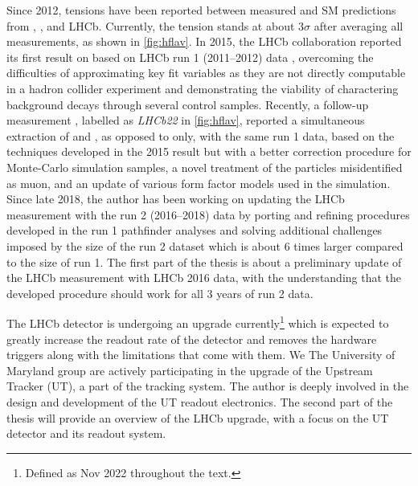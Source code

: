 Since 2012, tensions have been reported between measured \RDX and SM
predictions from \babar, \belle, and LHCb.
Currently, the tension stands at about $3 \sigma$ after averaging all
measurements,
as shown in \cref{fig:hflav}.
In 2015, the LHCb collaboration reported its first result on \RDst
based on LHCb run 1 (2011--2012) data
\cite{PhysRevLett.115.111803},
overcoming the difficulties of approximating key fit variables
as they are not directly computable in a hadron collider experiment
and demonstrating the viability of charactering background decays through
several control samples.
Recently, a follow-up measurement
\cite{RD_RDst_run1_2023},
labelled as \emph{LHCb22} in \cref{fig:hflav},
reported a simultaneous extraction of \RD and \RDst,
as opposed to \RDst only,
with the same run 1 data,
based on the techniques developed in the 2015 result but with
a better correction procedure for Monte-Carlo simulation samples,
a novel treatment of the particles misidentified as muon,
and an update of various form factor models used in the simulation.
Since late 2018,
the author has been working on updating the LHCb \RDX measurement with the run 2
(2016--2018) data by porting and refining procedures developed in the run 1
pathfinder analyses and solving additional challenges imposed by the size of the
run 2 dataset which is about 6 times larger compared to the size of run 1.
The first part of the thesis is about a preliminary update of the LHCb \RDX
measurement with LHCb 2016 data,
with the understanding that the developed procedure should work for all 3 years
of run 2 data.

The LHCb detector is undergoing an upgrade currently\footnote{
    Defined as Nov 2022 throughout the text.
} which is expected to greatly increase
the readout rate of the detector and removes the hardware triggers along
with the limitations that come with them.
We The University of Maryland group are actively participating in the upgrade
of the Upstream Tracker (UT), a part of the tracking system.
The author is deeply involved in the design and development of the UT readout
electronics.
The second part of the thesis will provide an overview of the LHCb upgrade,
with a focus on the UT detector and its readout system.


